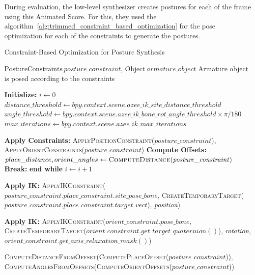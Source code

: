 \documentclass[../../main.tex]{subfiles}
\begin{document}
During evaluation, the low-level synthesizer creates postures for each of the frame using this Animated Score. For this, they used the algorithm~\ref{alg:trimmed_constraint_based_optimization} for the pose optimization for each of the constraints to generate the postures. 

\begin{algorithm}
  \caption{Constraint-Based Optimization for Posture Synthesis}
  \label{alg:trimmed_constraint_based_optimization}
  \begin{algorithmic}[1]
  \Require $\text{PostureConstraints} \ \mathit{posture\_constraint}$, $\text{Object} \ \mathit{armature\_object}$
  \Ensure Armature object is posed according to the constraints
  
  \State \textbf{Initialize:} $i \gets 0$
  \State $distance\_threshold \gets \mathit{bpy.context.scene.azee\_ik\_site\_distance\_threshold}$
  \State $angle\_threshold \gets \mathit{bpy.context.scene.azee\_ik\_bone\_rot\_angle\_threshold \times \pi / 180}$
  \State $max\_iterations \gets \mathit{bpy.context.scene.azee\_ik\_max\_iterations}$
  
      \State \textbf{Apply Constraints:} \textsc{ApplyPositionConstraint}($\mathit{posture\_constraint}$), \textsc{ApplyOrientConstraints}($\mathit{posture\_constraint}$)
      \State \textbf{Compute Offsets:} $place\_distance, orient\_angles \gets \textsc{ComputeDistance}(\mathit{posture\_constraint})$
          \State \textbf{Break:} \textbf{end while}
      \EndIf
      \State $i \gets i + 1$
  \EndWhile
  
          \State \textbf{Apply IK:} \textsc{ApplyIKConstraint}($\mathit{posture\_constraint.place\_constraint.site\_pose\_bone}$, 
          \textsc{CreateTemporaryTarget}($\mathit{posture\_constraint.place\_constraint.target\_vect}$), \textit{position})
      \EndIf
  \EndProcedure
  
          \State \textbf{Apply IK:} \textsc{ApplyIKConstraint}($orient\_constraint.pose\_bone$, 
          \textsc{CreateTemporaryTarget}($orient\_constraint.get\_target\_quaternion()$), \textit{rotation}, 
          $orient\_constraint.get\_axis\_relaxation\_mask()$)
      \EndFor
  \EndProcedure
  
      \State \Return \textsc{ComputeDistanceFromOffset}(\textsc{ComputePlaceOffset}($\mathit{posture\_constraint}$)), 
      \textsc{ComputeAnglesFromOffsets}(\textsc{ComputeOrientOffsets}($\mathit{posture\_constraint}$))
  \EndProcedure
  \end{algorithmic}
\end{algorithm}
\end{document}
